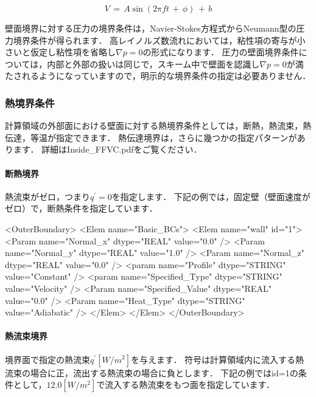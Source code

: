 \begin{equation}
V \,{=}\, A \sin \left( 2 \mathrm{\pi} ft \,+\, \phi \right) \,+\, b
\label{eq:harmonic out}
\end{equation}


壁面境界に対する圧力の境界条件は，Navier-Stokes方程式からNeumann型の圧力境界条件が得られます．
高レイノルズ数流れにおいては，粘性項の寄与が小さいと仮定し粘性項を省略し$\nabla p=0$の形式になります．
圧力の壁面境界条件については，内部と外部の扱いは同じで，スキーム中で壁面を認識し$\nabla p=0$が満たされるようになっていますので，明示的な境界条件の指定は必要ありません．

%
\subsubsection{熱境界条件}
計算領域の外部面における壁面に対する熱境界条件としては，断熱，熱流束，熱伝達，等温が指定できます．
熱伝達境界は，さらに幾つかの指定パターンがあります．
詳細はInside\_FFVC.pdfをご覧ください．

%
\paragraph{断熱境界}
熱流束がゼロ，つまり$q^{\prime}=0$を指定します．
下記の例では，固定壁（壁面速度がゼロ）で，断熱条件を指定しています．

{\small
\begin{program}
<OuterBoundary>
  <Elem name="Basic_BCs">
    <Elem name="wall" id="1">
      <Param name="Normal_x"        dtype="REAL"   value="0.0" />
      <Param name="Normal_y"        dtype="REAL"   value="1.0" />
      <Param name="Normal_z"        dtype="REAL"   value="0.0" />
      <param name="Profile"         dtype="STRING" value="Constant" />
      <param name="Specified_Type"  dtype="STRING" value="Velocity" />
      <Param name="Specified_Value" dtype="REAL"   value="0.0" />
      <Param name="Heat_Type"       dtype="STRING" value="Adiabatic" />
    </Elem>
  </Elem>
</OuterBoundary>
\end{program}
}

%
\paragraph{熱流束境界}
境界面で指定の熱流束$q^{\prime}[W/m^2]$を与えます．
符号は計算領域内に流入する熱流束の場合に正，流出する熱流束の場合に負とします．
下記の例ではid=1の条件として，$12.0[W/m^2]$で流入する熱流束をもつ面を指定しています．

